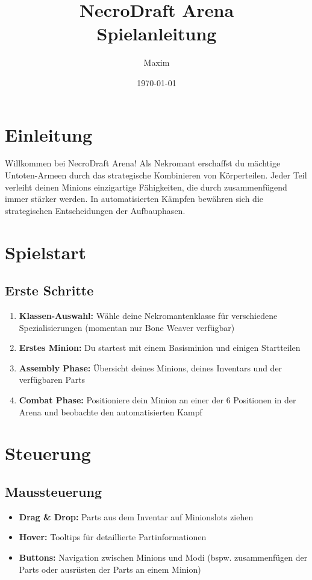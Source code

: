 \documentclass[12pt,a4paper]{article}
\title{\textbf{NecroDraft Arena}\\[0.5em]\large Spielanleitung}
\author{Maxim}
\date{\today}
\begin{document}
\maketitle
\newpage

\tableofcontents
\newpage

\section{Einleitung}

Willkommen bei NecroDraft Arena! Als Nekromant erschaffst du mächtige Untoten-Armeen durch das strategische Kombinieren von Körperteilen. 
Jeder Teil verleiht deinen Minions einzigartige Fähigkeiten, die durch zusammenfügend immer stärker werden.
In automatisierten Kämpfen bewähren sich die strategischen Entscheidungen der Aufbauphasen.

\section{Spielstart}

\subsection{Erste Schritte}
\begin{enumerate}
    \item \textbf{Klassen-Auswahl:} Wähle deine Nekromantenklasse für verschiedene Spezialisierungen (momentan nur Bone Weaver verfügbar)
    \item \textbf{Erstes Minion:} Du startest mit einem Basisminion und einigen Startteilen
    \item \textbf{Assembly Phase:} Übersicht deines Minions, deines Inventars und der verfügbaren Parts
    \item \textbf{Combat Phase:} Positioniere dein Minion an einer der 6 Positionen in der Arena und beobachte den automatisierten Kampf
\end{enumerate}

\section{Steuerung}

\subsection{Maussteuerung}
\begin{itemize}
    \item \textbf{Drag \& Drop:} Parts aus dem Inventar auf Minionslots ziehen
    \item \textbf{Hover:} Tooltips für detaillierte Partinformationen
    \item \textbf{Buttons:} Navigation zwischen Minions und Modi (bspw. zusammenfügen der Parts oder ausrüsten der Parts an einem Minion)
\end{itemize}
\end{document}
